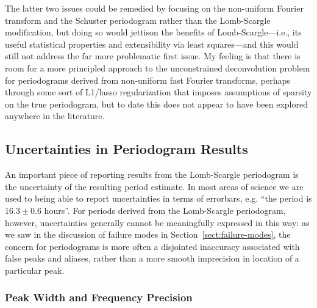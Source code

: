 \documentclass[preprint]{aastex}
\newcommand{\Sect}[1]{Section~\ref{sect:#1}}
\newcommand{\sect}[1]{\Sect{#1}}
\newcommand{\sectlabel}[1]{\label{sect:#1}}
\begin{document}
The latter two issues could be remedied by focusing on the non-uniform
Fourier transform and the Schuster periodogram rather than the Lomb-Scargle
modification, but doing so would jettison the benefits of Lomb-Scargle---i.e.,
its useful statistical properties and extensibility via least squares---and
this would still not address the far more problematic first issue.
My feeling is that there is room for a more principled approach to the
unconstrained deconvolution problem for periodograms derived from non-uniform
fast Fourier transforms, perhaps through some sort of L1/lasso regularization
that imposes assumptions of sparsity on the true periodogram, but to date this
does not appear to have been explored anywhere in the literature.


\subsection{Uncertainties in Periodogram Results}
\sectlabel{uncertainties}
An important piece of reporting results from the Lomb-Scargle periodogram is
the uncertainty of the resulting period estimate.
In most areas of science we are used to being able to report uncertainties in
terms of errorbars, {e.g.} ``the period is $16.3 \pm 0.6$ hours''.
For periods derived from the Lomb-Scargle periodogram, however, uncertainties
generally cannot be meaningfully expressed in this way:
as we saw in the discussion of failure modes in \sect{failure-modes},
the concern for periodograms is more often a disjointed inaccuracy associated
with false peaks and aliases, rather than a more smooth imprecision in
location of a particular peak.

\subsubsection{Peak Width and Frequency Precision}
\end{document}
